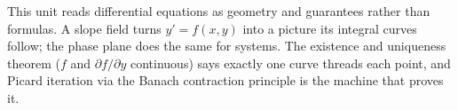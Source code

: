 \vspace{0.8em}
\begin{conceptbox}
This unit reads differential equations as \textcolor{accentorange}{geometry and
guarantees} rather than formulas. A \textcolor{accentorange}{slope field} turns
$y'=f(x,y)$ into a picture its integral curves follow; the
\textcolor{accentorange}{phase plane} does the same for systems. The
\textcolor{accentorange}{existence and uniqueness theorem} ($f$ and
$\partial f/\partial y$ continuous) says exactly one curve threads each point,
and \textcolor{accentorange}{Picard iteration via the Banach contraction
principle} is the machine that proves it.
\end{conceptbox}


